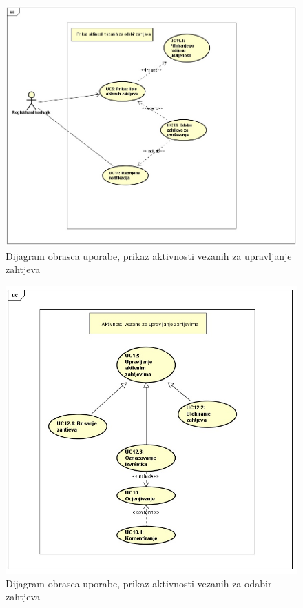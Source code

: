 \begin{figure}[H]
	\includegraphics[scale=0.65]{slike/uc_odabir_zahtjeva.jpg} %
	\centering
	\caption { Dijagram obrasca uporabe, prikaz aktivnosti vezanih za upravljanje zahtjeva}
	\label{fig:promjene}
\end{figure}

\begin{figure}[H]
	\includegraphics[scale=0.65]{slike/uc_upravljanje_zahtjevima.jpg} %
	\centering
	\caption { Dijagram obrasca uporabe, prikaz aktivnosti vezanih za odabir zahtjeva}
	\label{fig:promjene}
\end{figure}

